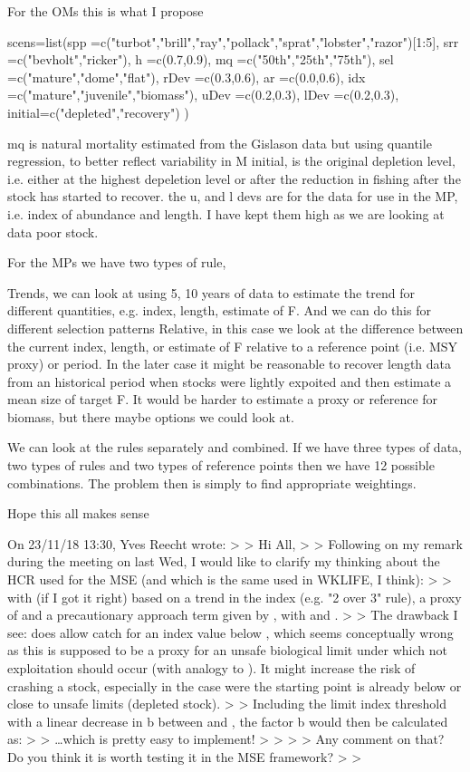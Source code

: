 \documentclass[]{article}
\begin{document}
For the OMs this is what I propose

scens=list(spp    =c("turbot","brill","ray","pollack","sprat","lobster","razor")[1:5],
           srr    =c("bevholt","ricker"),
           h      =c(0.7,0.9),
           mq     =c("50th","25th","75th"),
           sel    =c("mature","dome","flat"),
           rDev   =c(0.3,0.6),
           ar     =c(0.0,0.6),
           idx    =c("mature","juvenile","biomass"),
           uDev   =c(0.2,0.3),
           lDev   =c(0.2,0.3),
           initial=c("depleted","recovery")
           )

    mq is natural mortality estimated from the Gislason data but using quantile regression, to better reflect variability in M
    initial, is the original depletion level, i.e. either at the highest depeletion level or after the reduction in fishing after the stock has started to recover. 
    the u, and l devs are for the data for use in the MP, i.e. index of abundance and length. I have kept them high as we are looking at data poor stock.

For the MPs we have two types of rule,

    Trends, we can look at using 5, 10 years of data to estimate the trend for different quantities, e.g. index, length, estimate of F. And we can do this for different selection patterns
    Relative, in this case we look at the difference between the current index, length, or estimate of F relative to a reference point (i.e. MSY proxy) or period. In the later case it might be reasonable to recover length data from an historical period when stocks were lightly expoited and then estimate a mean size of target F. It would be harder to estimate a proxy or reference for biomass, but there maybe options we could look at.

 We can look at the rules separately and combined. If we have three types of data, two types of rules and two types of reference points then we have 12 possible combinations. The problem then is simply to find appropriate weightings.

Hope this all makes sense 



On 23/11/18 13:30, Yves Reecht wrote:
>
> Hi All,
>
> Following on my remark during the meeting on last Wed, I would like to clarify my thinking about the HCR used for the MSE (and which is the same used in WKLIFE, I think):
>
> with (if I got it right) based on a trend in the index (e.g. "2 over 3" rule), a proxy of and a precautionary approach term given by , with and .
>
> The drawback I see: does allow catch for an index value below , which seems conceptually wrong as this is supposed to be a proxy for an unsafe biological limit under which not exploitation should occur (with analogy to ). It might increase the risk of crashing a stock, especially in the case were the starting point is already below or close to unsafe limits (depleted stock).
>
> Including the limit index threshold with a linear decrease in b between and , the factor b would then be calculated as:
>
> …which is pretty easy to implement!
>
>  
>
> Any comment on that? Do you think it is worth testing it in the MSE framework?
>
>
\end{document}
